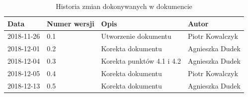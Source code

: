 \documentclass{article}
\begin{document}
\begin{titlepage}






\end{titlepage}

\addtocounter{page}{1}
\newpage

\begin{table}[h!]
	\begin{center}
		\caption{Historia zmian dokonywanych w dokumencie}
		\begin{tabular}{|l|l|l|l|}
			\hline
			Data & Numer wersji & Opis & Autor \\
			\hline \hline
			2018-11-26 & 0.1 & Utworzenie dokumentu & Piotr Kowalczyk \\
			\hline 
			2018-12-01 & 0.2 & Korekta dokumentu & Agnieszka Dudek \\
			\hline
			2018-12-04 & 0.3 & Korekta punktów 4.1 i 4.2 & Agnieszka Dudek \\
			\hline
			2018-12-05 & 0.4 & Korekta dokumentu & Piotr Kowalczyk \\
			\hline
			2018-12-13 & 0.5 & Korekta dokumentu & Agnieszka Dudek \\
			\hline			
    \end{tabular}
	\end{center}
\end{table}	

\tableofcontents

\newpage
\end{document}
